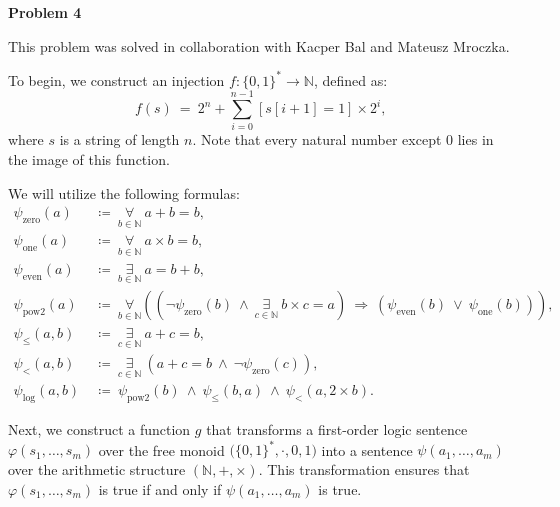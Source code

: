 \documentclass[12pt]{article}
\begin{document}
	\bigskip
	
	\textbf{Problem 4}
	
	\medskip
	
	This problem was solved in collaboration with Kacper Bal and Mateusz
	Mroczka.
	
	\medskip
	
	To begin, we construct an injection \(f : \{0, 1\}^{\ast} \to \mathbb{N}\),
	defined as:
	\[ f(s) \ = \ 2^{n} + \sum\limits_{i = 0}^{n - 1} [s[i + 1] = 1] \times
	2^{i} \text{,} \]
	where \(s\) is a string of length \(n\). Note that every natural number
	except \(0\) lies in the image of this function.
	
	\medskip
	
	We will utilize the following formulas:
	\begin{align*}
		\psi_{\text{zero}}(a) \ &\coloneqq \ \underset{b \in \mathbb{N}}
		{\forall} \ a + b = b \text{,} \\
		\psi_{\text{one}}(a) \ &\coloneqq \ \underset{b \in \mathbb{N}}{\forall}
		\ a \times b = b \text{,} \\
		\psi_{\text{even}}(a) \ &\coloneqq \ \underset{b \in \mathbb{N}}
		{\exists} \ a = b + b \text{,} \\
		\psi_{\text{pow2}}(a) \ &\coloneqq \ \underset{b \in \mathbb{N}}
		{\forall} \left( \left( \neg \psi_{\text{zero}}(b) \ \wedge \
		\underset{c \in \mathbb{N}}{\exists} \ b \times c = a \right) \
		\Rightarrow \ (\psi_{\text{even}}(b) \ \vee \ \psi_{\text{one}}(b))
		\right) \text{,} \\
		\psi_{\leqslant}(a, b) \ &\coloneqq \ \underset{c \in \mathbb{N}}
		{\exists} \ a + c = b \text{,} \\
		\psi_{<}(a, b) \ &\coloneqq \ \underset{c \in \mathbb{N}}{\exists} \ (a
		+ c = b \ \wedge \ \neg \psi_{\text{zero}}(c)) \text{,} \\
		\psi_{\text{log}}(a, b) \ &\coloneqq \ \psi_{\text{pow2}}(b) \ \wedge \
		\psi_{\leqslant}(b, a) \ \wedge \ \psi_{<}(a, 2 \times b) \text{.}
	\end{align*}
	
	Next, we construct a function \(g\) that transforms a first-order logic
	sentence \(\varphi(s_{1}, \ldots, s_{m})\) over the free monoid
	\(\big(\{0, 1\}^{\ast}, \cdot, 0, 1 \big)\) into a sentence \(\psi(a_{1},
	\ldots, a_{m})\) over the arithmetic structure \((\mathbb{N}, +, \times)\).
	This transformation ensures that \(\varphi(s_{1}, \ldots, s_{m})\) is true
	if and only if \(\psi(a_{1}, \ldots, a_{m})\) is true.
	
\end{document}
